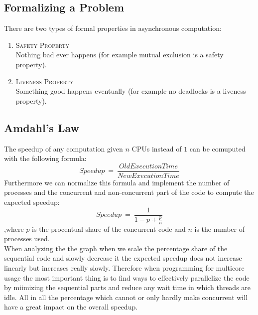 \documentclass{article}
\begin{document}
	\begin{adjustwidth}{2em}{2em}
		\subsection{Formalizing a Problem}
		\begin{adjustwidth}{2em}{2em}
			There are two types of formal properties in asynchronous computation:
			\begin{enumerate}[-]
				\item \textsc{Safety Property} \\
				Nothing bad ever happens (for example mutual exclusion is a safety property).
				\item \textsc{Liveness Property} \\
				Something good happens eventually (for example no deadlocks is a liveness property).
			\end{enumerate}
		\end{adjustwidth}
		\subsection{Amdahl's Law}
		\begin{adjustwidth}{2em}{2em}
			The speedup of any computation given $n$ CPUs instead of $1$ can be comuputed with the following formula:
			\[
				\textit{Speedup} \ = \ \frac{\textit{OldExecutionTime}}{\textit{NewExecutionTime}}
			\]
			Furthermore we can normalize this formula and implement the number of processes and the concurrent and non-concurrent part of the code to compute the expected speedup:
			\[
				\textit{Speedup} \ = \ \frac{1}{1-p+\frac{p}{n}}
			\]
			,where $p$ is the procentual share of the concurrent code and $n$ is the number of processes used. \\
			When analyzing the the graph when we scale the percentage share of the sequential code and slowly decrease it the expected speedup does not increase linearly but increases really slowly. Therefore when programming for multicore usage the most important thing is to find ways to effectively parallelize the code by miimizing the sequential parts and reduce any wait time in which threads are idle. All in all the percentage which cannot or only hardly make concurrent will have a great impact on the overall speedup.
		\end{adjustwidth}
	\end{adjustwidth}
	
\end{document}
